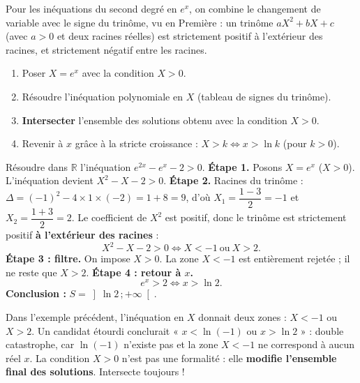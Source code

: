 \documentclass[11pt]{article}
\newcommand{\cle}[1]{{\popxbold\color{popdark}#1}}
\begin{document}
Pour les inéquations du second degré en $e^x$, on combine le changement de variable avec le \cle{signe du trinôme}, vu en Première : un trinôme $aX^2 + bX + c$ (avec $a > 0$ et deux racines réelles) est strictement positif à l'extérieur des racines, et strictement négatif entre les racines.

\begin{methode}
\begin{enumerate}
\item Poser $X = e^x$ avec la condition $X > 0$.
\item Résoudre l'inéquation polynomiale en $X$ (tableau de signes du trinôme).
\item \textbf{Intersecter} l'ensemble des solutions obtenu avec la condition $X > 0$.
\item Revenir à $x$ grâce à la stricte croissance : $X > k \Leftrightarrow x > \ln k$ (pour $k > 0$).
\end{enumerate}
\end{methode}

\begin{exoresolu}[Résoudre $e^{2x} - e^x - 2 > 0$]
Résoudre dans $\mathbb{R}$ l'inéquation $e^{2x} - e^x - 2 > 0$.
\tcblower
\textbf{Étape 1.} Posons $X = e^x$ ($X > 0$). L'inéquation devient $X^2 - X - 2 > 0$.
\textbf{Étape 2.} Racines du trinôme : $\Delta = (-1)^2 - 4 \times 1 \times (-2) = 1 + 8 = 9$, d'où $X_1 = \dfrac{1-3}{2} = -1$ et $X_2 = \dfrac{1+3}{2} = 2$. Le coefficient de $X^2$ est positif, donc le trinôme est strictement positif \textbf{à l'extérieur des racines} :
\[ X^2 - X - 2 > 0 \Leftrightarrow X < -1 \ \text{ou}\ X > 2. \]
\textbf{Étape 3 : filtre.} On impose $X > 0$. La zone $X < -1$ est entièrement rejetée ; il ne reste que $X > 2$.
\textbf{Étape 4 : retour à $x$.}
\[ e^x > 2 \Leftrightarrow x > \ln 2. \]
\textbf{Conclusion :} $S = \left]\ln 2 \,; +\infty\right[$.
\end{exoresolu}

\begin{attention}
Dans l'exemple précédent, l'inéquation en $X$ donnait deux zones : $X < -1$ ou $X > 2$. Un candidat étourdi conclurait « $x < \ln(-1)$ ou $x > \ln 2$ » : double catastrophe, car $\ln(-1)$ n'existe pas et la zone $X < -1$ ne correspond à aucun réel $x$. La condition $X > 0$ n'est pas une formalité : elle \textbf{modifie l'ensemble final des solutions}. Intersecte toujours !
\end{attention}
\end{document}

